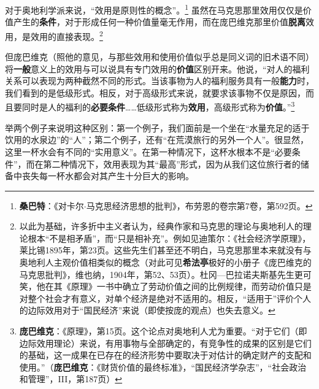 \documentclass[fontset=fandol, a4paper, 12pt, openright]{ctexbook}
\begin{document}
对于奥地利学派来说，“效用是原则性的概念”。\footnote{\textbf{桑巴特}：《对卡尔$\cdot$马克思经济思想的批判》，布劳恩的卷宗第7卷，第592页。} 虽然在马克思那里效用仅仅是价值产生的\textbf{条件}，对于形成任何一种价值量毫无作用，而在庞巴维克那里价值\textbf{脱离}效用，是效用的直接表现。\footnote{以此为基础，许多折中主义者认为，经典作家和马克思的理论与奥地利人的理论根本“不是相矛盾”，而“只是相补充”。例如见迪策尔：《社会经济学原理》，莱比锡1895年，第23页。这些先生们甚至还不明白，马克思那里本来就没有与奥地利人主观价值相类似的概念（对此可见\textbf{希法亭}极好的小册子《庞巴维克的马克思批判》，维也纳，1904年，第52、53页）。杜冈—巴拉诺夫斯基先生更可笑，他在其《原理》一书中确立了劳动价值之间的比例规律，而劳动价值只是对整个社会才有意义，对单个经济是绝对不适用的。相反，“适用于”评价个人的边际效用对于“国民经济”来说（即使按庞的观点）也失去意义。}

但庞巴维克（照他的意见，与那些效用和使用价值似乎总是同义词的旧术语不同）将\textbf{一般}意义上的效用与可以说具有专门效用的\textbf{价值}区别开来。他说，“对人的福利关系可以表现为两种截然不同的形式。当该事物为人的福利服务具有一般\textbf{能力}时，我们看到的是低级形式。相反，对于高级形式来说，就要求该事物不仅是原因，而且要同时是人的福利的\textbf{必要条件}……低级形式称为\textbf{效用}，高级形式称为\textbf{价值}。”\footnote{\textbf{庞巴维克}：《原理》，第15页。这个论点对奥地利人尤为重要。“对于它们（即边际效用理论）来说，有用事物与全部确定的，有竞争性的成果的区别是它们的基础，这一成果在已存在的经济形势中要取决于对估计的确定财产的支配和使用。”（\textbf{庞巴维克}：《财货价值的最终标准》，“国民经济学杂志”，“社会政治和管理”，III，第187页）}

举两个例子来说明这种区别：第一个例子，我们面前是一个坐在“水量充足的适于饮用的水泉边”的“人”；第二个例子，还有“在荒漠旅行的另外一个人”。很显然，这里一杯水会有不同的“实用意义”。在第一种情况下，这杯水根本不是“必要条件”，而在第二种情况下，效用表现为其“最高”形式，因为从我们这位旅行者的储备中丧失每一杯水都会对其产生十分巨大的影响。
\end{document}
